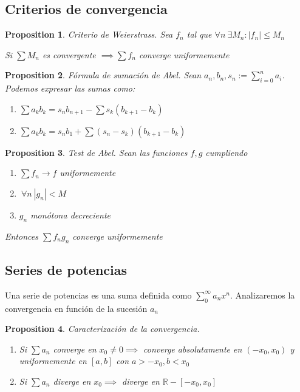 \documentclass{myclass}
\newtheorem*{proposition}{Proposition}
\begin{document}
\subsection{Criterios de convergencia}
\begin{proposition}
 Criterio de Weierstrass. Sea $f_n$ tal que  $\forall n \ \exists M_n : |f_n|\le M_n$

 Si $\sum M_n$ es convergente  $\implies \sum f_n$ converge uniformemente
\end{proposition}

\begin{proposition}
Fórmula de sumación de Abel. Sean $a_n, b_n, s_n := \sum_{i=0}^n a_i$. Podemos expresar las sumas como:
\begin{enumerate}[topsep=0pt, itemsep=0pt]
  \item $\displaystyle\sum a_kb_k = s_nb_{n+1} - \sum s_k(b_{k+1}-b_k)$ 
  \item $\displaystyle\sum a_kb_k = s_nb_1 + \sum (s_n-s_k)(b_{k+1}-b_k)$ 
\end{enumerate}
\end{proposition}

\begin{proposition}
Test de Abel. Sean las funciones $f, g$ cumpliendo
 \begin{enumerate}[topsep=0pt, itemsep=0pt]
  \item $\sum f_n\to f$ uniformemente
  \item  $\ \forall n \ |g_n| <M$
  \item $g_n$ monótona decreciente
\end{enumerate}
Entonces $\sum f_ng_n$ converge uniformemente
\end{proposition}

\subsection{Series de potencias}
Una serie de potencias es una suma definida como $\displaystyle \sum_0^\infty a_nx^n$. Analizaremos la convergencia en función de la sucesión $a_n$
\begin{proposition}
Caracterización de la convergencia.
\begin{enumerate}[topsep=0pt, itemsep=0pt]
  \item Si $\sum a_n$ converge en $x_0\neq 0 \implies $ converge absolutamente en $(-x_0, x_0)$ y uniformemente en $[a, b]$ con  $a>-x_0, b<x_0$
  \item Si  $\sum a_n$ diverge en $x_0 \implies$ diverge en $\mathbb{R}-[-x_0, x_0]$
\end{enumerate}
\end{proposition}
\end{document}
